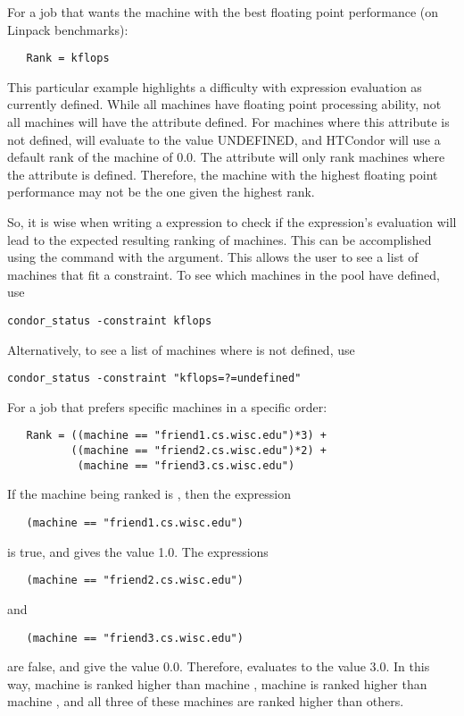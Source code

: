 For a job that wants the machine with the best floating point
performance (on Linpack benchmarks):
\begin{verbatim}
   Rank = kflops
\end{verbatim}
This particular example highlights a difficulty with  expression
evaluation as currently defined.
While all machines have floating point processing ability,
not all machines will have the  attribute defined.
For machines where this attribute is not defined,
 will evaluate to the value UNDEFINED, and
HTCondor will use a default rank of the machine of 0.0.
The  attribute will only rank machines where
the attribute is defined.
Therefore, the machine with the highest floating point
performance may not be the one given the highest rank.

So, it is wise when writing a  expression to check
if the expression's evaluation will lead to the expected
resulting ranking of machines.
This can be accomplished using the  command with the
 argument.  This allows the user to see a list of
machines that fit a constraint.
To see which machines in the pool have  defined,
use
\begin{verbatim}
condor_status -constraint kflops
\end{verbatim}
Alternatively, to see a list of machines where 
 is not defined, use
\begin{verbatim}
condor_status -constraint "kflops=?=undefined"
\end{verbatim}

For a job that prefers specific machines in a specific order:
\begin{verbatim}
   Rank = ((machine == "friend1.cs.wisc.edu")*3) +
          ((machine == "friend2.cs.wisc.edu")*2) +
           (machine == "friend3.cs.wisc.edu")
\end{verbatim}
If the machine being ranked is , then the
expression
\begin{verbatim}
   (machine == "friend1.cs.wisc.edu")
\end{verbatim}
is true, and gives the value 1.0.
The expressions
\begin{verbatim}
   (machine == "friend2.cs.wisc.edu")
\end{verbatim}
and
\begin{verbatim}
   (machine == "friend3.cs.wisc.edu")
\end{verbatim}
are false, and give the value 0.0.
Therefore,  evaluates to the value 3.0.
In this way, machine  is ranked higher than
machine ,
machine 
is ranked higher than 
machine ,
and all three of these machines are ranked higher than others.

